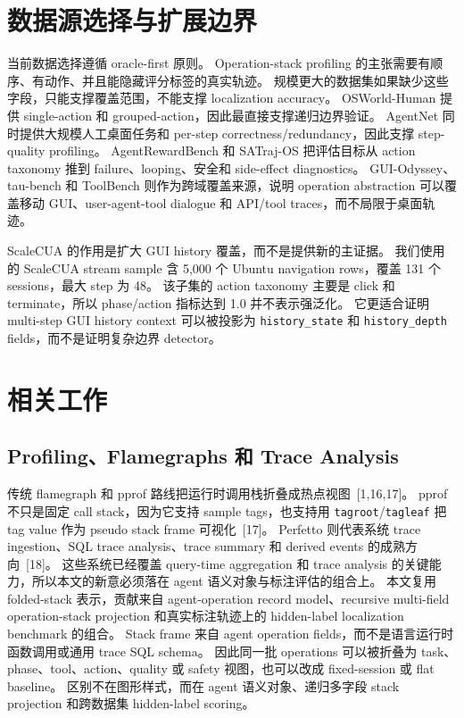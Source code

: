 \documentclass[10pt,twocolumn]{ctexart}
\begin{document}
\section{数据源选择与扩展边界}

当前数据选择遵循 oracle-first 原则。
Operation-stack profiling 的主张需要有顺序、有动作、并且能隐藏评分标签的真实轨迹。
规模更大的数据集如果缺少这些字段，只能支撑覆盖范围，不能支撑 localization accuracy。
OSWorld-Human 提供 single-action 和 grouped-action，因此最直接支撑递归边界验证。
AgentNet 同时提供大规模人工桌面任务和 per-step correctness/redundancy，因此支撑 step-quality profiling。
AgentRewardBench 和 SATraj-OS 把评估目标从 action taxonomy 推到 failure、looping、安全和 side-effect diagnostics。
GUI-Odyssey、tau-bench 和 ToolBench 则作为跨域覆盖来源，说明 operation abstraction 可以覆盖移动 GUI、user-agent-tool dialogue 和 API/tool traces，而不局限于桌面轨迹。

ScaleCUA 的作用是扩大 GUI history 覆盖，而不是提供新的主证据。
我们使用的 ScaleCUA stream sample 含 5,000 个 Ubuntu navigation rows，覆盖 131 个 sessions，最大 step 为 48。
该子集的 action taxonomy 主要是 click 和 terminate，所以 phase/action 指标达到 1.0 并不表示强泛化。
它更适合证明 multi-step GUI history context 可以被投影为 \texttt{history\_state} 和 \texttt{history\_depth} fields，而不是证明复杂边界 detector。

\section{相关工作}

\subsection{Profiling、Flamegraphs 和 Trace Analysis}
传统 flamegraph 和 pprof 路线把运行时调用栈折叠成热点视图~[1,16,17]。
pprof 不只是固定 call stack，因为它支持 sample tags，也支持用 \texttt{tagroot}/\texttt{tagleaf} 把 tag value 作为 pseudo stack frame 可视化~[17]。
Perfetto 则代表系统 trace ingestion、SQL trace analysis、trace summary 和 derived events 的成熟方向~[18]。
这些系统已经覆盖 query-time aggregation 和 trace analysis 的关键能力，所以本文的新意必须落在 agent 语义对象与标注评估的组合上。
本文复用 folded-stack 表示，贡献来自 agent-operation record model、recursive multi-field operation-stack projection 和真实标注轨迹上的 hidden-label localization benchmark 的组合。
Stack frame 来自 agent operation fields，而不是语言运行时函数调用或通用 trace SQL schema。
因此同一批 operations 可以被折叠为 task、phase、tool、action、quality 或 safety 视图，也可以改成 fixed-session 或 flat baseline。
区别不在图形样式，而在 agent 语义对象、递归多字段 stack projection 和跨数据集 hidden-label scoring。
\end{document}
